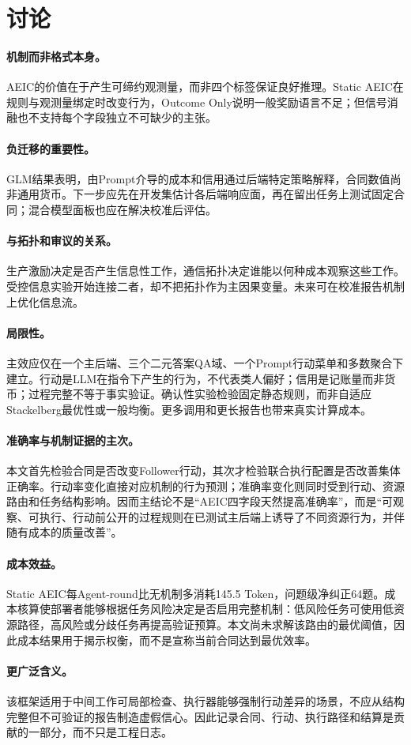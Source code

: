 \section{讨论}\label{sec:discussion}
\paragraph{机制而非格式本身。}AEIC的价值在于产生可缔约观测量，而非四个标签保证良好推理。Static AEIC在规则与观测量绑定时改变行为，Outcome Only说明一般奖励语言不足；但信号消融也不支持每个字段独立不可缺少的主张。

\paragraph{负迁移的重要性。}GLM结果表明，由Prompt介导的成本和信用通过后端特定策略解释，合同数值尚非通用货币。下一步应先在开发集估计各后端响应面，再在留出任务上测试固定合同；混合模型面板也应在解决校准后评估。

\paragraph{与拓扑和审议的关系。}生产激励决定是否产生信息性工作，通信拓扑决定谁能以何种成本观察这些工作。受控信息实验开始连接二者，却不把拓扑作为主因果变量。未来可在校准报告机制上优化信息流。

\paragraph{局限性。}主效应仅在一个主后端、三个二元答案QA域、一个Prompt行动菜单和多数聚合下建立。行动是LLM在指令下产生的行为，不代表类人偏好；信用是记账量而非货币；过程完整不等于事实验证。确认性实验检验固定静态规则，而非自适应Stackelberg最优性或一般均衡。更多调用和更长报告也带来真实计算成本。

\paragraph{准确率与机制证据的主次。}本文首先检验合同是否改变Follower行动，其次才检验联合执行配置是否改善集体正确率。行动率变化直接对应机制的行为预测；准确率变化则同时受到行动、资源路由和任务结构影响。因而主结论不是“AEIC四字段天然提高准确率”，而是“可观察、可执行、行动前公开的过程规则在已测试主后端上诱导了不同资源行为，并伴随有成本的质量改善”。

\paragraph{成本效益。}Static AEIC每Agent-round比无机制多消耗145.5 Token，问题级净纠正64题。成本核算使部署者能够根据任务风险决定是否启用完整机制：低风险任务可使用低资源路径，高风险或分歧任务再提高验证预算。本文尚未求解该路由的最优阈值，因此成本结果用于揭示权衡，而不是宣称当前合同达到最优效率。

\paragraph{更广泛含义。}该框架适用于中间工作可局部检查、执行器能够强制行动差异的场景，不应从结构完整但不可验证的报告制造虚假信心。因此记录合同、行动、执行路径和结算是贡献的一部分，而不只是工程日志。
